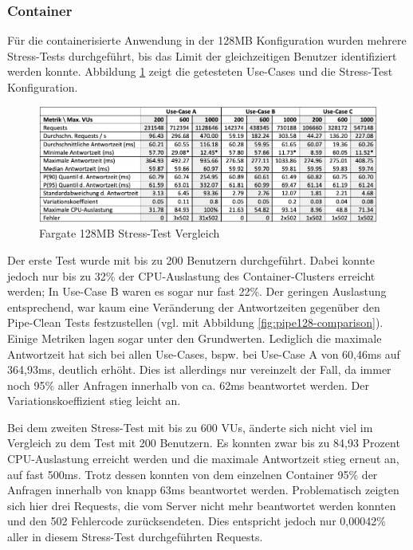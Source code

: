 \subsubsection{Container}
Für die containerisierte Anwendung in der 128MB Konfiguration wurden mehrere Stress-Tests durchgeführt, bis das Limit der gleichzeitigen Benutzer identifiziert werden konnte. Abbildung \ref{fig:fargate128-stress-comparison} zeigt die getesteten Use-Cases und die Stress-Test Konfiguration. 

\begin{figure}[H]
    \includegraphics[width=\textwidth]{img/fargate128-stress-comparison.png}
    \caption[Fargate 128MB Stress-Test Vergleich]{Fargate 128MB Stress-Test Vergleich}
    \label{fig:fargate128-stress-comparison}
\end{figure}

Der erste Test wurde mit bis zu 200 Benutzern durchgeführt. Dabei konnte jedoch nur bis zu 32\% der CPU-Auslastung des Container-Clusters erreicht werden; In Use-Case B waren es sogar nur fast 22\%. Der geringen Auslastung entsprechend, war kaum eine Veränderung der Antwortzeiten gegenüber den Pipe-Clean Tests festzustellen (vgl. mit Abbildung \ref{fig:pipe128-comparison}). Einige Metriken lagen sogar unter den Grundwerten. Lediglich die maximale Antwortzeit hat sich bei allen Use-Cases, bspw. bei Use-Case A von 60,46ms auf 364,93ms, deutlich erhöht. Dies ist allerdings nur vereinzelt der Fall, da immer noch 95\% aller Anfragen innerhalb von ca. 62ms beantwortet werden. Der Variationskoeffizient stieg leicht an. 

Bei dem zweiten Stress-Test mit bis zu 600 VUs, änderte sich nicht viel im Vergleich zu dem Test mit 200 Benutzern. Es konnten zwar bis zu 84,93 Prozent CPU-Auslastung erreicht werden und die maximale Antwortzeit stieg erneut an, auf fast 500ms. Trotz dessen konnten von dem einzelnen Container 95\% der Anfragen innerhalb von knapp 63ms beantwortet werden. Problematisch zeigten sich hier drei Requests, die vom Server nicht mehr beantwortet werden konnten und den 502 Fehlercode zurücksendeten. Dies entspricht jedoch nur 0,00042\% aller in diesem Stress-Test durchgeführten Requests.

